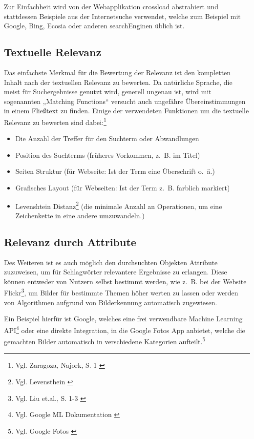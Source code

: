 Zur Einfachheit wird von der Webapplikation \gls{crossload} abstrahiert und stattdessen Beispiele aus der Internetsuche verwendet, welche zum Beispiel mit Google, Bing, Ecosia oder anderen \gls{searchEngine}n üblich ist.

\subsection{Textuelle Relevanz}
\label{sub:relevanceText}
Das einfachste Merkmal für die Bewertung der Relevanz ist den kompletten Inhalt nach der textuellen Relevanz zu bewerten.
Da natürliche Sprache, die meist für Suchergebnisse genutzt wird, generell ungenau ist, wird mit sogenannten „Matching Functions“ versucht auch ungefähre Übereinstimmungen in einem Fließtext zu finden.
Einige der verwendeten Funktionen um die textuelle Relevanz zu bewerten sind dabei:\footnote{Vgl. Zaragoza, Najork, S. 1 \cite{zaragoza2018}}

\begin{itemize}
  \item Die Anzahl der Treffer für den Suchterm oder Abwandlungen
  \item Position des Suchterms (früheres Vorkommen, z. B. im Titel)
  \item Seiten Struktur (für Webseite: Ist der Term eine Überschrift o. ä.)
  \item Grafisches Layout (für Webseiten: Ist der Term z. B. farblich markiert)
  \item Levenshtein Distanz\footnote{Vgl. Levensthein \cite{levenshtein1966binary}} (die minimale Anzahl an Operationen, um eine Zeichenkette in eine andere umzuwandeln.)
\end{itemize}
\subsection{Relevanz durch Attribute}
\label{sub:relevanceAttribute}
Des Weiteren ist es auch möglich den durchsuchten Objekten Attribute zuzuweisen, um für Schlagwörter relevantere Ergebnisse zu erlangen.
Diese können entweder von Nutzern selbst bestimmt werden, wie z. B. bei der Website Flickr\footnote{Vgl. Liu et.al., S. 1-3 \cite{liu2009}}, um Bilder für bestimmte Themen höher werten zu lassen oder werden von Algorithmen aufgrund von Bilderkennung automatisch zugewiesen.

Ein Beispiel hierfür ist Google, welches eine frei verwendbare Machine Learning API\footnote{Vgl. Google ML Dokumentation \cite{googledevelopers2022}} oder eine direkte Integration, in die Google Fotos App anbietet, welche die gemachten Bilder automatisch in verschiedene Kategorien aufteilt.\footnote{Vgl. Google Fotos \cite{googlephotos2022}}

